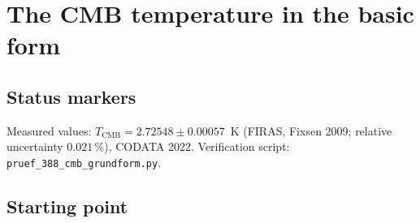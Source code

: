 
\providecommand{\BM}{\textbf{[B]}}
\providecommand{\KM}{\textbf{[K]}}
\providecommand{\SM}{\textbf{[S]}}
\providecommand{\XM}{\textbf{[X]}}
\providecommand{\QM}{\textbf{[Q]}}

\chapter*{The CMB temperature in the basic form}

\begin{abstract}
The Casimir-CMB connection is an identity, because the length $L_\xi$ is fixed solely through the
CMB temperature (R136). This document collects all routes meant to obtain $T_{\mathrm{CMB}}$ from
$\xi$ without this circularity and recalculates them in the basic form: natural units with
$\alpha=1$, a single anchor $m_e$. The eV relation $T_{\mathrm{CMB}}=\frac{16}{9}\xi$~eV with
second-order correction agrees to $2\times10^{-6}$, but holds only in the unit eV, whose size was
fixed in 1881 and set exactly in 2019. In the basic form, $T_{\mathrm{CMB}}/m_e$ depends on a
single number. The candidate $T_{\mathrm{CMB}}/m_e=(8\pi)^{1/4}\,\xi^{5/2}$ meets the FIRAS value
to $0.12\sigma$, together with the corpus form of $H_0$ gives $T_{\mathrm{CMB}}^4=16\,H_0\,m_e^3$,
and makes $L_\xi$ independent of the CMB. The $H_0$ form with exponent~10 fits it; the older one
with $41/4$ is off by $11\sigma$. Neither the prefactor nor the exponent is derived; what remains
open is listed at the end.
\end{abstract}

\section*{Status markers}

Measured values: $T_{\mathrm{CMB}}=2.72548\pm0.00057$~K (FIRAS, Fixsen 2009; relative uncertainty
$0.021\,\%$), CODATA 2022. Verification script: \texttt{pruef\_388\_cmb\_grundform.py}.

\section{Starting point}

